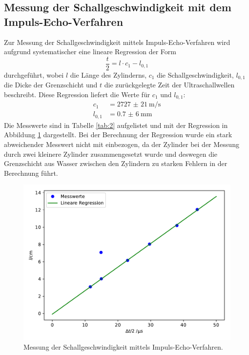\subsection{Messung der Schallgeschwindigkeit mit dem Impuls-Echo-Verfahren}
Zur Messung der Schallgeschwindigkeit mittels Impuls-Echo-Verfahren wird aufgrund systematischer eine lineare Regression der Form
\begin{equation*}
  \frac{t}{2} = l \cdot c_1 -l_{0,1}
\end{equation*}
durchgeführt, wobei $l$ die Länge des Zylinderns, $c_1$ die Schallgeschwindigkeit, $l_{0,1}$ die Dicke der Grenzschicht und $t$ die zurückgelegte Zeit der
Ultraschallwellen beschreibt.
Diese Regression liefert die Werte für $c_1$ und $l_{0,1}$:
\begin{align*}
  c_1 &= \SI{2727(21)}{\meter\per\second} \\
  l_{0,1} &= \SI{0,7(6)}{\milli\meter}
\end{align*}
Die Messwerte sind in Tabelle \ref{tab:2} aufgelistet und mit der Regression in Abbildung \ref{abb:3} dargestellt.
Bei der Berechnung der Regression wurde ein stark abweichender Messwert nicht mit einbezogen, da der Zylinder bei der Messung durch zwei kleinere Zylinder
zusammengesetzt wurde und deswegen die Grenzschicht aus Wasser zwischen den Zylindern zu starken Fehlern in der Berechnung führt.
\begin{figure}
  \centering
  \includegraphics[scale=0.7]{Schallgeschwindigkeit1.pdf}
  \caption{Messung der Schallgeschwindigkeit mittels Impuls-Echo-Verfahren.}
  \label{abb:3}
\end{figure}

